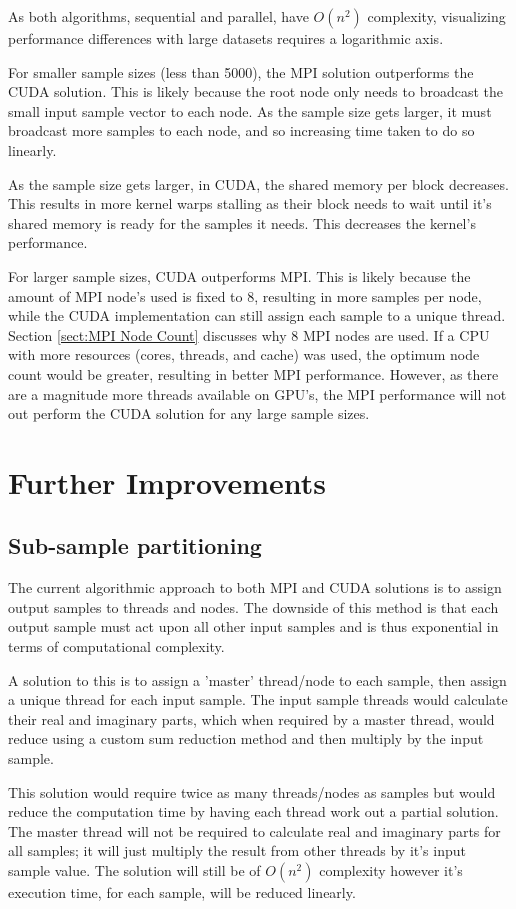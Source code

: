 \documentclass[11pt,a4paper]{article}
\begin{document}
As both algorithms, sequential and parallel, have $O(n^2)$ complexity, visualizing performance differences with large datasets requires a logarithmic axis.

For smaller sample sizes (less than 5000), the MPI solution outperforms the CUDA solution. This is likely because the root node only needs to broadcast the small input sample vector to each node. As  the sample size gets larger, it must broadcast more samples to each node, and so increasing time taken to do so linearly. 

As the sample size gets larger, in CUDA, the shared memory per block decreases. This results in more kernel warps stalling as their block needs to wait until it's shared memory is ready for the samples it needs. This decreases the kernel's performance. 

For larger sample sizes, CUDA outperforms MPI. This is likely because the amount of MPI node's used is fixed to 8, resulting in more samples per node, while the CUDA implementation can still assign each sample to a unique thread. Section \ref{sect:MPI Node Count} discusses why 8 MPI nodes are used. If a CPU with more resources (cores, threads, and cache) was used, the optimum node count would be greater, resulting in better MPI performance. However, as there are a magnitude more threads available on GPU's, the MPI performance will not out perform the CUDA solution for any large sample sizes.

\section{Further Improvements}
\subsection{Sub-sample partitioning}
The current algorithmic approach to both MPI and CUDA solutions is to assign output samples to threads and nodes. The downside of this method is that each output sample must act upon all other input samples and is thus exponential in terms of computational complexity.

A solution to this is to assign a 'master' thread/node to each sample, then assign a unique thread for each input sample. The input sample threads would calculate their real and imaginary parts, which when required by a master thread, would reduce using a custom sum reduction method and then multiply by the input sample.

This solution would require twice as many threads/nodes as samples but would reduce the computation time by having each thread work out a partial solution. The master thread will not be required to calculate real and imaginary parts for all samples; it will just multiply the result from other threads by it's input sample value. The solution will still be of $O(n^2)$ complexity however it's execution time, for each sample, will be reduced linearly.
\end{document}
